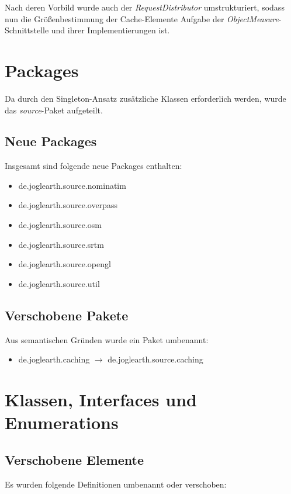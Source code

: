 \documentclass[10pt]{scrreprt}
\begin{document}
Nach deren Vorbild wurde auch der \textit{RequestDistributor} umstrukturiert, sodass nun die Größenbestimmung der Cache-Elemente Aufgabe der \textit{ObjectMeasure}-Schnittstelle und ihrer Implementierungen ist.

\section{Packages}

Da durch den Singleton-Ansatz zusätzliche Klassen erforderlich werden, wurde das \textit{source}-Paket aufgeteilt. 

\subsection*{Neue Packages}
Insgesamt sind folgende neue Packages enthalten:
\begin{itemize}
\item de.joglearth.source.nominatim
\item de.joglearth.source.overpass
\item de.joglearth.source.osm
\item de.joglearth.source.srtm
\item de.joglearth.source.opengl
\item de.joglearth.source.util
\end{itemize}

\subsection*{Verschobene Pakete}
Aus semantischen Gründen wurde ein Paket umbenannt:
\begin{itemize}
\item de.joglearth.caching $ \rightarrow $ de.joglearth.source.caching
\end{itemize}

\section{Klassen, Interfaces und Enumerations}

\subsection*{Verschobene Elemente}
Es wurden folgende Definitionen umbenannt oder verschoben:
\end{document}
